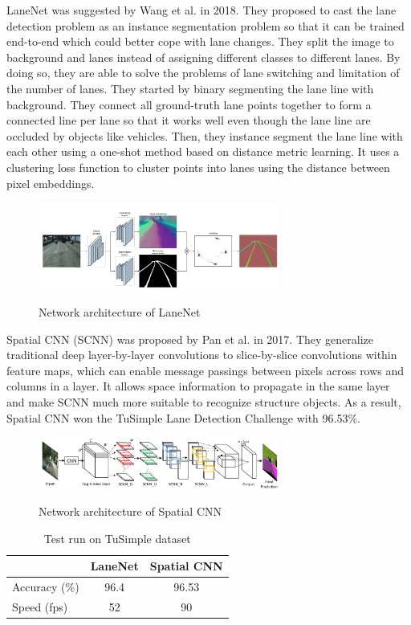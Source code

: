 \documentclass[runningheads]{llncs}
\begin{document}
LaneNet was suggested by Wang et al.\cite{LaneNet} in 2018. 
They proposed to cast the lane detection problem as an 
instance segmentation problem so that it can be trained 
end-to-end which could better cope with lane changes. 
They split the image to background and lanes instead of 
assigning different classes to different lanes. By doing so, 
they are able to solve the problems of lane switching and 
limitation of the number of lanes. They started by binary 
segmenting the lane line with background. They connect 
all ground-truth lane points together to form a connected 
line per lane so that it works well even though the lane 
line are occluded by objects like vehicles. Then, they 
instance segment the lane line with each other using a 
one-shot method based on distance metric learning. It uses a 
clustering loss function to cluster points into lanes using 
the distance between pixel embeddings.
 
\begin{figure}
    \centering
    \includegraphics[width=8cm]{reference/lanenet}
    \label{fig:LaneNet}
    \caption{Network architecture of LaneNet}
\end{figure}

Spatial CNN (SCNN) was proposed by Pan et al.
\cite{SpatialCNN} in 2017. They generalize traditional 
deep layer-by-layer convolutions to slice-by-slice 
convolutions within feature maps, which can enable message 
passings between pixels across rows and columns in a layer. 
It allows space information to propagate in the same layer 
and make SCNN much more suitable to recognize structure 
objects. As a result, Spatial CNN won the TuSimple Lane 
Detection Challenge with 96.53\%. 

\begin{figure}
    \centering
    \includegraphics[width=8cm]{reference/scnn}
    \label{fig:SCNN}
    \caption{Network architecture of Spatial CNN}
\end{figure}

\begin{table}[!htbp]
	\centering
	\begin{tabular}{|l|c|c|}
		\hline 
		&LaneNet&Spatial CNN\\
		\hline  
		Accuracy (\%)&96.4&96.53\\
		\hline  
		Speed (fps)&52&90\\
		\hline 
	\end{tabular}
	\caption{Test run on TuSimple dataset}
\end{table}
\end{document}
